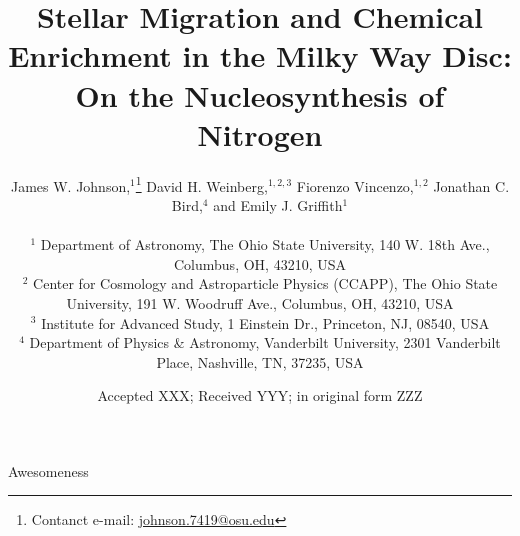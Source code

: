 \documentclass[fleqn, usenatbib]{mnras}
\title[On the Nucleosynthesis of Nitrogen]{Stellar Migration and Chemical 
Enrichment in the Milky Way Disc: On the Nucleosynthesis of Nitrogen}
\author[J.W. Johnson et al.]{James W. Johnson,$^{1}$\thanks{
	Contanct e-mail: \href{mailto:
	johnson.7419@osu.edu}{johnson.7419@osu.edu}} 
	David H. Weinberg,$^{1, 2, 3}$ 
	Fiorenzo Vincenzo,$^{1, 2}$ 
	Jonathan C. Bird,$^{4}$ 
	\newauthor 
	and Emily J. Griffith$^{1}$ 
	\\ \null \\ 
	$^{1}$ Department of Astronomy, The Ohio State University, 
	140 W. 18th Ave., Columbus, OH, 43210, USA 
	\\ 
	$^{2}$ Center for Cosmology and Astroparticle Physics (CCAPP), 
	The Ohio State University, 191 W. Woodruff Ave., Columbus, OH, 43210, USA 
	\\ 
	$^{3}$ Institute for Advanced Study, 1 Einstein Dr., Princeton, NJ, 08540, 
	USA 
	\\ 
	$^{4}$ Department of Physics \& Astronomy, Vanderbilt University, 
	2301 Vanderbilt Place, Nashville, TN, 37235, USA 
}
\date{Accepted XXX; Received YYY; in original form ZZZ}
\begin{document}
 
\label{firstpage} 
\pagerange{\pageref{firstpage}--\pageref{lastpage}} 
\maketitle 

 

\begin{keywords} 
Awesomeness 
\end{keywords} 

 
 
 

 
 

\label{lastpage} 
\end{document}
